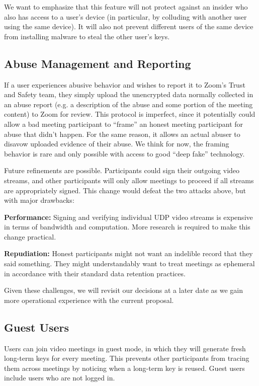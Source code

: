 We want to emphasize that this feature will not protect against an insider who also has access to a
user's device (in particular, by colluding with another user using the same device). It will also not
prevent different users of the same device from installing malware to steal the other user's keys.

\subsection{Abuse Management and Reporting}
If a user experiences abusive behavior and wishes to report it to Zoom's Trust and Safety team, they simply upload the unencrypted data normally collected in an abuse report (e.g. a description of the abuse and some portion of the meeting content) to Zoom for review. This protocol is imperfect, since it potentially could allow a bad meeting participant to ``frame'' an honest meeting participant for abuse that didn't happen. For the same reason, it allows an actual abuser to disavow uploaded evidence of their abuse. We think for now, the framing behavior is rare and only possible with access to good ``deep fake'' technology.

Future refinements are possible. Participants could sign their outgoing video streams, and other participants will only allow meetings to proceed if all streams are appropriately signed. This change would defeat the two attacks above, but with major drawbacks:
%
\begin{description}
    \item {\bf Performance:} Signing and verifying individual UDP video streams is expensive in terms of bandwidth and computation. More research is required to make this change practical.
    \item {\bf Repudiation:} Honest participants might not want an indelible record that they said something. They might understandably want to treat meetings as ephemeral in accordance with their standard data retention practices.
\end{description}

Given these challenges, we will revisit our decisions at a later date as we gain more operational experience with the current proposal.

\subsection{Guest Users}
Users can join video meetings in guest mode, in which they will generate fresh long-term keys for every meeting. This prevents other participants from tracing them across meetings by noticing when a long-term key is reused. Guest users include users who are not logged in.

